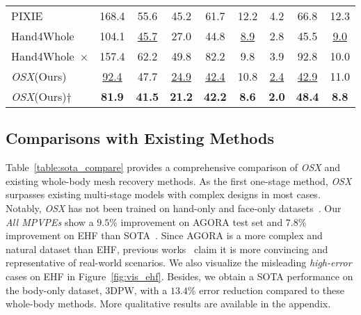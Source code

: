 \documentclass[10pt,twocolumn,letterpaper]{article}
\newcommand{\modelname}{\emph{OSX}\xspace}
\newcommand{\dataname}{\emph{UBody}\xspace}
\begin{document}
\begin{table*}[h]
\begin{center}
\begin{minipage}[t]{0.57\textwidth}
{\begin{tabular}{l|ccc|ccc|cc}
PIXIE~\cite{Feng_2021_pixie} &168.4 & 55.6 & 45.2 & 61.7 & 12.2  & 4.2 & 66.8	&12.3 \\
    Hand4Whole~\cite{GyeongsikMoon2020hand4whole} &104.1 & \underline{45.7} & 27.0 & 44.8 & \underline{8.9}  & 2.8 & 45.5&	\underline{9.0} \\
Hand4Whole~\cite{GyeongsikMoon2020hand4whole}$\times$ &157.4 & 62.2 & 49.8 & 82.2 & 9.8  & 3.9 & 92.8&	10.0\\
    \midrule
    \modelname (Ours) & \underline{92.4} & 47.7  &\underline{24.9} & \underline{42.4}& 10.8 & \underline{2.4}  & \underline{42.9}&	11.0 \\
    \modelname (Ours)$\dagger$ & \textbf{81.9}&	\textbf{41.5}&	\textbf{21.2}&\textbf{42.2}&\textbf{8.6}&	\textbf{2.0}&	\textbf{48.4}&	\textbf{8.8} \\
    \bottomrule
    \end{tabular}}
    \vspace{-0.2cm}
  \caption[Reconstruction errors on the proposed \dataname test set.]{Reconstruction errors on \dataname test set on the \emph{intra-scene} protocol. All models are pretrained on previous datasets, except for the results labeled by (i) $\dagger$: finetuned on the \dataname training data; (ii) $\times$: finetuned on the AGORA training data. The result of the \emph{inter-scene} setting is in the appendix.}
  \label{tab:3d_smplx_results}\end{minipage}
  \vspace{-0.9cm}
  \end{center}
\end{table*}

\subsection{Comparisons with Existing Methods}

Table~\ref{table:sota_compare} provides a comprehensive comparison of \modelname and existing whole-body mesh recovery methods. 
As the first one-stage method, \modelname surpasses existing multi-stage models with complex designs in most cases. Notably, \modelname has not been trained on hand-only and face-only datasets~\cite{Zimmermann_2019FreiHAND,TeroKarras2018ASG,GyeongsikMoon2020InterHand26MAD}. 
Our \emph{All MPVPEs} show a $9.5$\% improvement on AGORA test set and $7.8$\% improvement on EHF than SOTA~\cite{GyeongsikMoon2020hand4whole}.
Since AGORA is a more complex and natural dataset than EHF, previous works~\cite{GyeongsikMoon2020hand4whole,Patel_2021agora} claim it is more convincing and representative of real-world scenarios. We also visualize the misleading \emph{high-error} cases on EHF in Figure~\ref{fig:vis_ehf}.
Besides, we obtain a SOTA performance on the body-only dataset, 3DPW, with a $13.4$\% error reduction compared to these whole-body methods. More qualitative results are available in the appendix.
\end{document}

